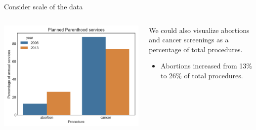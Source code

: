 \documentclass[aspectratio=169]{../latex_main/tntbeamer}  %
\begin{document}
	
	\begin{frame}{Consider scale of the data}
	
	    \begin{columns}
	        \begin{column}{.5\textwidth}

	                    \centering
	                    \includegraphics[scale=.6]{Bild53}

	        \end{column}
	        
	        
	        \begin{column}{.4\textwidth}
	        
	              We could also visualize abortions and cancer screenings as a percentage of total procedures.
	              \begin{itemize}
	                  \item Abortions increased from 13\% to 26\% of total procedures.
	              \end{itemize}
	        \end{column}
	    \end{columns}
	\end{frame}
	
\end{document}

